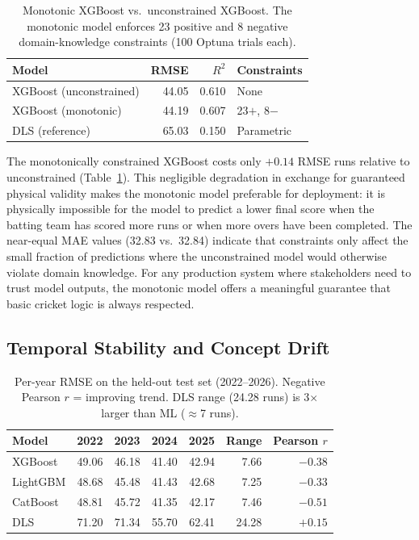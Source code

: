 \documentclass[10pt,a4paper,twocolumn]{article}
\begin{document}
\begin{table}[htbp]
\centering
\caption{Monotonic XGBoost vs.\ unconstrained XGBoost. The monotonic model enforces 23 positive and 8 negative domain-knowledge constraints (100 Optuna trials each).}
\label{tab:monotonic}
\small
\begin{tabular}{lrrl}
\toprule
\textbf{Model} & \textbf{RMSE} & $R^2$ & \textbf{Constraints} \\
\midrule
XGBoost (unconstrained) & 44.05 & 0.610 & None \\
XGBoost (monotonic)     & 44.19 & 0.607 & 23$+$, 8$-$ \\
\midrule
DLS (reference)         & 65.03 & 0.150 & Parametric \\
\bottomrule
\end{tabular}
\end{table}

The monotonically constrained XGBoost costs only $+0.14$ RMSE runs relative to unconstrained (Table~\ref{tab:monotonic}). This negligible degradation in exchange for guaranteed physical validity makes the monotonic model preferable for deployment: it is physically impossible for the model to predict a lower final score when the batting team has scored more runs or when more overs have been completed. The near-equal MAE values (32.83 vs.\ 32.84) indicate that constraints only affect the small fraction of predictions where the unconstrained model would otherwise violate domain knowledge. For any production system where stakeholders need to trust model outputs, the monotonic model offers a meaningful guarantee that basic cricket logic is always respected.

\subsection{Temporal Stability and Concept Drift}

\begin{table}[htbp]
\centering
\caption{Per-year RMSE on the held-out test set (2022--2026). Negative Pearson $r$ = improving trend. DLS range (24.28 runs) is 3$\times$ larger than ML ($\approx$7 runs).}
\label{tab:drift}
\small
\begin{tabular}{lrrrrrr}
\toprule
\textbf{Model} & \textbf{2022} & \textbf{2023} & \textbf{2024} & \textbf{2025} & \textbf{Range} & \textbf{Pearson $r$} \\
\midrule
XGBoost  & 49.06 & 46.18 & 41.40 & 42.94 & 7.66 & $-0.38$ \\
LightGBM & 48.68 & 45.48 & 41.43 & 42.68 & 7.25 & $-0.33$ \\
CatBoost & 48.81 & 45.72 & 41.35 & 42.17 & 7.46 & $-0.51$ \\
DLS      & 71.20 & 71.34 & 55.70 & 62.41 & 24.28 & $+0.15$ \\
\bottomrule
\end{tabular}
\end{table}
\end{document}
